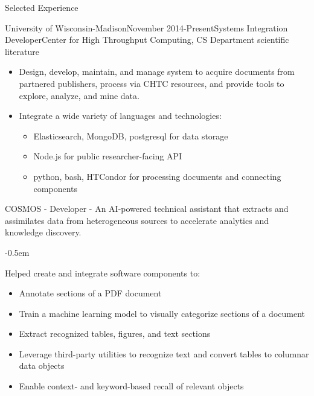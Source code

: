\documentclass{resume} %
\begin{document}
\begin{rSection}{Selected Experience}
\begin{rSubsection}{University of Wisconsin-Madison}{November
    2014-Present}{Systems Integration Developer}{Center for High Throughput
    Computing, CS Department}
    scientific literature
    \begin{itemize}{}{\leftmargin=1.5em} 
      \renewcommand\labelitemi{$\cdot$}
      \itemsep -0.5em \vspace{-0.5em} %
      \item Design, develop, maintain, and manage system to acquire
          documents from partnered publishers, process via CHTC resources,
          and provide tools to explore, analyze, and mine data.
      \item Integrate a wide variety of languages and technologies:
        \renewcommand\labelitemi{$\cdot$}
        \begin{itemize}{}{\leftmargin=1.25em} 
          \itemsep -0.3em \vspace{-0.3em} %
          \item Elasticsearch, MongoDB, postgresql for data storage
          \item Node.js for public researcher-facing API
          \item python, bash, HTCondor for processing documents and
          connecting components
        \end{itemize}
    \end{itemize}
\item COSMOS - Developer - An AI-powered technical assistant that extracts and assimilates data from heterogeneous sources to accelerate analytics and knowledge discovery. 
    \begin{list}{}{\leftmargin=1.5em} 
      \itemsep -0.5em \vspace{-0.5em} %
      \item Helped create and integrate software components to:
        \renewcommand\labelitemi{$\cdot$}
          \begin{itemize}{}{\leftmargin=1.25em}
          \item Annotate sections of a PDF document
          \item Train a machine learning model to visually categorize sections
              of a document
          \item Extract recognized tables, figures, and text sections
          \item Leverage third-party utilities to recognize text and convert tables
              to columnar data objects
          \item Enable context- and keyword-based recall of relevant objects

\end{itemize}
\end{list}
\end{rSubsection}
\end{rSection}
\end{document}
